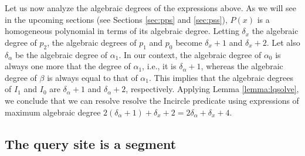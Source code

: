 \documentclass[letterpaper,11pt]{article}
\newcommand{\incircle}{\textsf{Incircle}\xspace}
\newtheorem{lemma}[theorem]{Lemma}
\begin{document}
Let us now analyze the algebraic degrees of the expressions above. As
we will see in the upcoming sections (see Sections \ref{sec:pps} and
\ref{sec:pss}), $P(x)$ is a homogeneous polynomial in terms of its
algebraic degree. Letting $\delta_x$ the algebraic degree of $p_2$,
the algebraic degrees of $p_1$ and $p_0$ become $\delta_x+1$ and
$\delta_x+2$. Let also $\delta_\alpha$ be the algebraic degree of
$\alpha_1$. In our context, the algebraic degree of $\alpha_0$ is
always one more that the degree of $\alpha_1$, i.e., it is
$\delta_\alpha+1$, whereas the algebraic degree of $\beta$ is always
equal to that of $\alpha_1$. This implies that the algebraic
degrees of $I_1$ and $I_0$ are $\delta_\alpha+1$ and
$\delta_\alpha+2$, respectively. Applying Lemma \ref{lemma:lqsolve}, we
conclude that we can resolve resolve the \incircle predicate using
expressions of maximum algebraic degree
$2(\delta_\alpha+1)+\delta_x+2=2\delta_\alpha+\delta_x+4$.

\begin{comment}
Hence, the 
algebraic degree of the quantity $p_2I_0^2-p_1 I_1 I_0+p_0I_1^2$ is
$\max\{\delta_x+2m+4,\delta_x+2n+4\}$. Similarly, the
algebraic degree of the quantity $-2p_2 I_0 +p_1 I_1$ is
$\max\{\delta_x+m+2,\delta_x+n+2\}$. Since the algebraic
degree of $p_2I_0^2-p_1 I_1 I_0+p_0I_1^2$ is always greater or equal
to that of $-2p_2 I_0 +p_1 I_1$, we conclude the following:

\begin{lemma}\label{incircle:xxxp}
  Answering the $\incircle(S_1,S_2,S_3,Q)$ predicate, when at least
  one of the sites $S_1$, $S_2$ or $S_3$ is a point, amounts to
  computing the sign of a polynomial expressions of algebraic degree
  at most $\max\{\delta_x+2m+4,\delta_x+2n+4\}$.
\end{lemma}
\end{comment}

\subsection{The query site is a segment}\label{sec:pxss}
\end{document}
